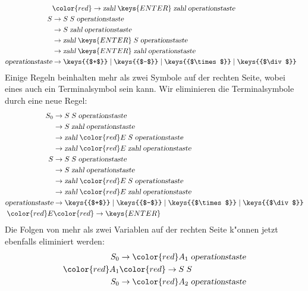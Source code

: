 \begin{loesung}
\begin{teilaufgaben}
\begin{align*}
\\
 &\color{red}\rightarrow \textsl{zahl}\;\keys{ENTER}\; \textsl{zahl}\;\textsl{operationstaste}
\\
S&\rightarrow S \; S \; \textsl{operationstaste}
\\
 &\rightarrow S \; \textsl{zahl} \; \textsl{operationstaste}
\\
 &\rightarrow \textsl{zahl}\;\keys{ENTER}\; S\;\textsl{operationstaste}
\\
 &\rightarrow \textsl{zahl}\;\keys{ENTER}\; \textsl{zahl}\;\textsl{operationstaste}
\\
\textsl{operationstaste}&\rightarrow
\keys{{$+$}}
\;|\;
\keys{{$-$}}
\;|\;
\keys{{$\times$}}
\;|\;
\keys{{$\div$}}
\end{align*}
Einige Regeln beinhalten mehr als zwei Symbole auf der rechten Seite, 
wobei eines auch ein Terminalsymbol sein kann. Wir eliminieren die
Terminalsymbole durch eine neue Regel:
\begin{align*}
S_0&\rightarrow S \; S \; \textsl{operationstaste}
\\
 &\rightarrow S \; \textsl{zahl} \; \textsl{operationstaste}
\\
 &\rightarrow \textsl{zahl}\; {\color{red}E} \; S\;\textsl{operationstaste}
\\
 &\rightarrow \textsl{zahl}\; {\color{red}E} \; \textsl{zahl}\;\textsl{operationstaste}
\\
S&\rightarrow S \; S \; \textsl{operationstaste}
\\
 &\rightarrow S \; \textsl{zahl} \; \textsl{operationstaste}
\\
 &\rightarrow \textsl{zahl} \; {\color{red}E} \; S\;\textsl{operationstaste}
\\
 &\rightarrow \textsl{zahl}\; {\color{red}E} \; \textsl{zahl}\;\textsl{operationstaste}
\\
\textsl{operationstaste}&\rightarrow
\keys{{$+$}}
\;|\;
\keys{{$-$}}
\;|\;
\keys{{$\times$}}
\;|\;
\keys{{$\div$}}
\\
\color{red}E&\color{red}\rightarrow\keys{ENTER}
\end{align*}
Die Folgen von mehr als zwei Variablen auf der rechten Seite k"onnen jetzt
ebenfalls eliminiert werden:
\begin{align*}
S_0&\rightarrow {\color{red}A_1} \; \textsl{operationstaste}
\\
\color{red}A_1&\color{red}\rightarrow S \; S 
\\
S_0&\rightarrow {\color{red}A_2} \; \textsl{operationstaste}
\\

\end{align*}
\end{teilaufgaben}
\end{loesung}
